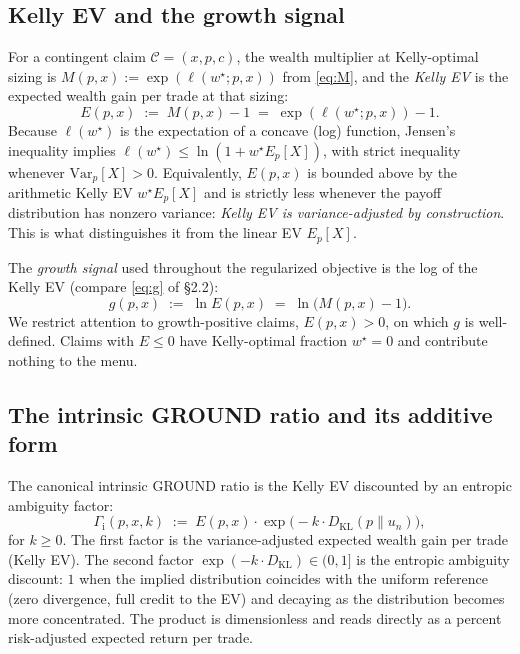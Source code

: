 \documentclass[11pt]{article}
\theoremstyle{definition}
\theoremstyle{remark}
\newcommand{\C}{\mathcal{C}}
\newcommand{\G}{g}
\newcommand{\KL}{D_{\mathrm{KL}}}
\newcommand{\GROUND}{\Gamma_{\mathrm{i}}}
\begin{document}
\subsection{Kelly EV and the growth signal}

For a contingent claim $\C = (x, p, c)$, the wealth multiplier at
Kelly-optimal sizing is $M(p, x) := \exp(\ell(w^\star; p, x))$ from
\eqref{eq:M}, and the \emph{Kelly EV} is the expected wealth gain
per trade at that sizing:
\begin{equation}
E(p, x) \;:=\; M(p, x) - 1 \;=\; \exp(\ell(w^\star; p, x)) - 1.
\label{eq:kelly-ev}
\end{equation}
Because $\ell(w^\star)$ is the expectation of a concave (log)
function, Jensen's inequality implies $\ell(w^\star) \le
\ln(1 + w^\star E_p[X])$, with strict inequality whenever
$\mathrm{Var}_p[X] > 0$. Equivalently, $E(p, x)$ is bounded above by
the arithmetic Kelly EV $w^\star E_p[X]$ and is strictly less
whenever the payoff distribution has nonzero variance: \emph{Kelly EV
is variance-adjusted by construction}. This is what distinguishes it
from the linear EV $E_p[X]$.

The \emph{growth signal} used throughout the regularized objective
is the log of the Kelly EV (compare \eqref{eq:g} of §2.2):
\begin{equation}
\G(p, x) \;:=\; \ln E(p, x) \;=\; \ln\bigl(M(p, x) - 1\bigr).
\label{eq:gdef}
\end{equation}
We restrict attention to growth-positive claims, $E(p, x) > 0$, on
which $\G$ is well-defined. Claims with $E \le 0$ have Kelly-optimal
fraction $w^\star = 0$ and contribute nothing to the menu.

\subsection{The intrinsic GROUND ratio and its additive form}

The canonical intrinsic GROUND ratio is the Kelly EV discounted by
an entropic ambiguity factor:
\begin{equation}
\GROUND(p, x, k) \;:=\; E(p, x) \cdot \exp\!\bigl(-k \cdot \KL(p \| u_n)\bigr),
\label{eq:ground}
\end{equation}
for $k \ge 0$. The first factor is the variance-adjusted expected
wealth gain per trade (Kelly EV). The second factor $\exp(-k \cdot
\KL) \in (0, 1]$ is the entropic ambiguity discount: $1$ when the
implied distribution coincides with the uniform reference (zero
divergence, full credit to the EV) and decaying as the distribution
becomes more concentrated. The product is dimensionless and reads
directly as a percent risk-adjusted expected return per trade.
\end{document}

